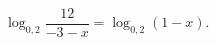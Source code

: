 \begin{ex}[type=equation]
	\begin{condition}
		$\log_{0,2} \dfrac{12}{-3-x} = \log_{0,2}(1 - x) .$
	\end{condition}
\end{ex}